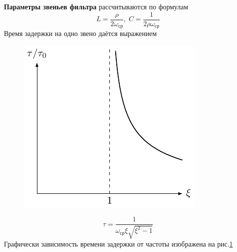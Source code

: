 \textbf{Параметры звеньев фильтра} рассчитываются по формулам
\begin{equation}
\label{eq:6.5}
L=\frac{\rho}{2\omega_{\text{ср}}},\;
C=\frac{1}{2\rho\omega_{\text{ср}}}
\end{equation}
Время задержки на одно звено даётся выражением
\begin{figure}[h!]
	\centering
	\includegraphics[]{chem/FHF/tau2.pdf}
	\caption{}
	\label{fig:6.4}
\end{figure}
\begin{equation}
\label{eq:6.6}
\tau=\frac{1}{\omega_{\text{ср}}\xi\sqrt{\xi^2-1}}
\end{equation}
Графически зависимость времени задержки от частоты изображена на рис.\ref{fig:6.4}
